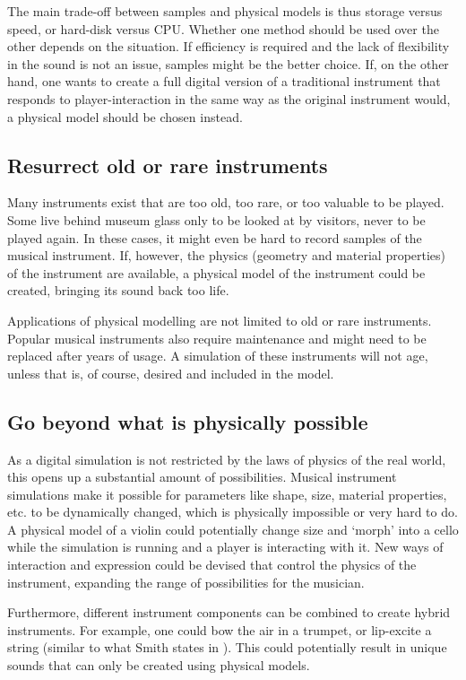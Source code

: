 The main trade-off between samples and physical models is thus storage versus speed, or hard-disk versus CPU. Whether one method should be used over the other depends on the situation. If efficiency is required and the lack of flexibility in the sound is not an issue, samples might be the better choice. If, on the other hand, one wants to create a full digital version of a traditional instrument that responds to player-interaction in the same way as the original instrument would, a physical model should be chosen instead.

\subsection{Resurrect old or rare instruments}
Many instruments exist that are too old, too rare, or too valuable to be played. Some live behind museum glass only to be looked at by visitors, never to be played again. In these cases, it might even be hard to record samples of the musical instrument. If, however, the physics (geometry and material properties) of the instrument are available, a physical model of the instrument could be created, bringing its sound back too life.

Applications of physical modelling are not limited to old or rare instruments. Popular musical instruments also require maintenance and might need to be replaced after years of usage. A simulation of these instruments will not age, unless that is, of course, desired and included in the model.

\subsection{Go beyond what is physically possible}\label{sec:impossible}
As a digital simulation is not restricted by the laws of physics of the real world, this opens up a substantial amount of possibilities.
Musical instrument simulations make it possible for parameters like shape, size, material properties, etc. to be dynamically changed, which is physically impossible or very hard to do. A physical model of a violin could potentially change size and `morph' into a cello while the simulation is running and a player is interacting with it. New ways of interaction and expression could be devised that control the physics of the instrument, expanding the range of possibilities for the musician. 

Furthermore, different instrument components can be combined to create hybrid instruments. For example, one could bow the air in a trumpet, or lip-excite a string (similar to what Smith states in \cite{Smith2010a}). This could potentially result in unique sounds that can only be created using physical models.

